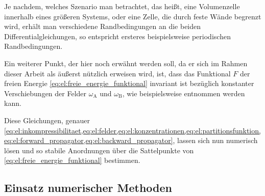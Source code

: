 Je nachdem, welches Szenario man betrachtet, das heißt, eine Volumenzelle innerhalb eines größeren Systems, oder eine Zelle, die durch feste Wände begrenzt wird, erhält man verschiedene Randbedingungen an die beiden Differentialgleichungen, so entspricht ersteres beispielsweise periodischen Randbedingungen.

Ein weiterer Punkt, der hier noch erwähnt werden soll, da er sich im Rahmen dieser Arbeit als äußerst nützlich erweisen wird, ist, dass das Funktional $F$ der freien Energie \cref{eq:el:freie_energie_funktional} invariant ist bezüglich konstanter Verschiebungen der Felder $\omega_{\mathrm{A}}$ und $\omega_{\mathrm{B}}$, wie beispielsweise \cite{Ceniceros:2006is} entnommen werden kann.

Diese Gleichungen, genauer \cref{eq:el:inkompressibilitaet,eq:el:felder,eq:el:konzentrationen,eq:el:partitionsfunktion,eq:el:forward_propagator,eq:el:backward_propagator}, lassen sich nun numerisch lösen und so stabile Anordnungen über die Sattelpunkte von \cref{eq:el:freie_energie_funktional} bestimmen.


\subsection*{Einsatz numerischer Methoden} %

